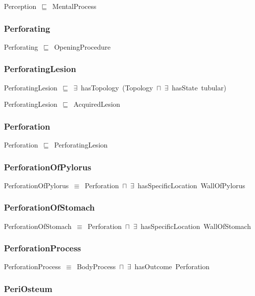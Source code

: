 \documentclass{article}
\begin{document}
Perception~\ensuremath{\sqsubseteq}~MentalProcess~

\subsubsection*{Perforating}

Perforating~\ensuremath{\sqsubseteq}~OpeningProcedure~

\subsubsection*{PerforatingLesion}

PerforatingLesion~\ensuremath{\sqsubseteq}~\ensuremath{\exists}~hasTopology~(Topology~\ensuremath{\sqcap}~\ensuremath{\exists}~hasState~tubular)~

PerforatingLesion~\ensuremath{\sqsubseteq}~AcquiredLesion~

\subsubsection*{Perforation}

Perforation~\ensuremath{\sqsubseteq}~PerforatingLesion~

\subsubsection*{PerforationOfPylorus}

PerforationOfPylorus~\ensuremath{\equiv}~Perforation~\ensuremath{\sqcap}~\ensuremath{\exists}~hasSpecificLocation~WallOfPylorus

\subsubsection*{PerforationOfStomach}

PerforationOfStomach~\ensuremath{\equiv}~Perforation~\ensuremath{\sqcap}~\ensuremath{\exists}~hasSpecificLocation~WallOfStomach

\subsubsection*{PerforationProcess}

PerforationProcess~\ensuremath{\equiv}~BodyProcess~\ensuremath{\sqcap}~\ensuremath{\exists}~hasOutcome~Perforation

\subsubsection*{PeriOsteum}
\end{document}
